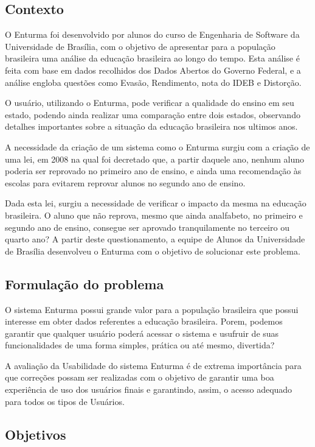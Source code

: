 \subsection{Contexto}
	

	O Enturma foi desenvolvido por alunos do curso de Engenharia de Software da Universidade de Brasília, com o objetivo de apresentar para a população brasileira uma análise da educação brasileira ao longo do tempo. Esta análise é feita com base em dados recolhidos dos Dados Abertos do Governo Federal, e a análise engloba questões como Evasão, Rendimento, nota do IDEB e Distorção.

	O usuário, utilizando o Enturma, pode verificar a qualidade do ensino em seu estado, podendo ainda realizar uma comparação entre dois estados, observando detalhes importantes sobre a situação da educação brasileira nos ultimos anos.

	A necessidade da criação de um sistema como o Enturma surgiu com a criação de uma lei, em 2008 na qual foi decretado que, a partir daquele ano, nenhum aluno poderia ser reprovado no primeiro ano de ensino, e ainda uma recomendação às escolas para evitarem reprovar alunos no segundo ano de ensino.

	Dada esta lei, surgiu a necessidade de verificar o impacto da mesma na educação brasileira. O aluno que não reprova, mesmo que ainda analfabeto, no primeiro e segundo ano de ensino, consegue ser aprovado tranquilamente no terceiro ou quarto ano? A partir deste questionamento, a equipe de Alunos da Universidade de Brasília desenvolveu o Enturma com o objetivo de solucionar este problema.

\subsection{Formulação do problema}
	
	O sistema Enturma possui grande valor para a população brasileira que possui interesse em obter dados referentes a educação brasileira. Porem, podemos garantir que qualquer usuário poderá acessar o sistema e usufruir de suas funcionalidades de uma forma simples, prática ou até mesmo, divertida? 

	A avaliação da Usabilidade do sistema Enturma é de extrema importância para que correções possam ser realizadas com o objetivo de garantir uma boa experiência de uso dos usuários finais e garantindo, assim, o acesso adequado para todos os tipos de Usuários.

\subsection{Objetivos}


